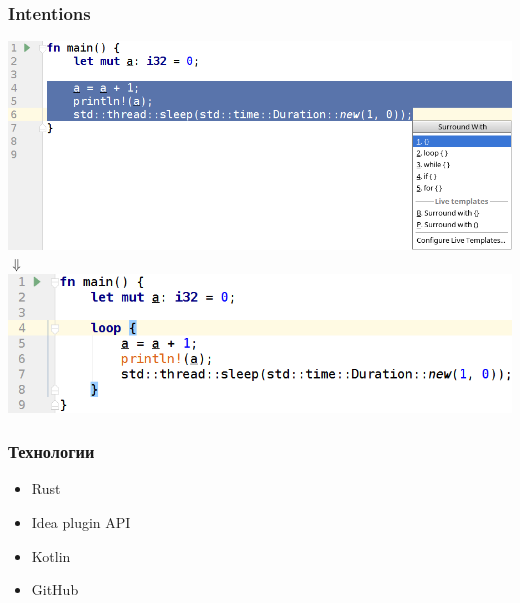\documentclass[10pt,pdf,hyperref={unicode}]{beamer}
\begin{document}
\begin{frame}
	\frametitle{Intentions} 
	\includegraphics[scale = 0.4]{loop_before.png}\\
	{
		\centering $\Downarrow$ \\
	}
	\includegraphics[scale = 0.4]{loop_after.png}
\end{frame}

\begin{frame}
	\frametitle{Технологии} 
	\begin{itemize}
		\item Rust
		\item Idea plugin API
		\item Kotlin
		\item GitHub
	\end{itemize}
\end{frame}
\end{document}
